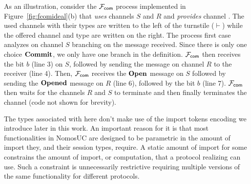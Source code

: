 As an illustration, consider the $\mathcal{F}_{{\mathsf {com}}}$ process implemented in Figure~\ref{fig:fcomideal}(b)
that \emph{uses} channels $S$ and $R$ and \emph{provides} channel .
The used channels with their types are written to the left of the turnstile
($\vdash$) while the offered channel and type are written on the right.
The process first case analyzes on channel $S$ branching on the
message received.
Since there is only one choice $\mathbf{Commit}$, we only have one
branch in the definition.
$\mathcal{F}_{{\mathsf {com}}}$ then receives the bit $b$ (line 3) on $S$, followed by sending the
 message on channel $R$ to the receiver (line 4).
Then, $\mathcal{F}_{{\mathsf {com}}}$ receives the $\mathbf{Open}$ message on $S$ followed by sending the
$\mathbf{Opened}$ message on $R$ (line 6), followed by the bit $b$ (line 7).
$\mathcal{F}_{{\mathsf {com}}}$ then waits for the channels $R$ and $S$ to terminate and then finally
terminates the  channel (code not shown for brevity).

The types associated with \Fcom here don't make use of the import tokens encoding we 
introduce later in this work. An important reason for it is that most functionalities
in NomosUC are designed to be parametric in the amount of import they, and their
session types, require. A static amount of import for some \F constrains the 
amount of import, or computation, that a protocol realizing \F can use. 
Such a constraint is unnecessarily restrictive requiring multiple versions
of the same functionality for different protocols. 



%

